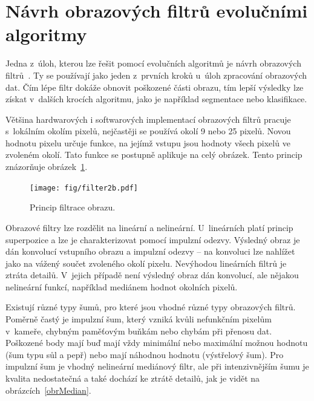 \section{Návrh obrazových filtrů evolučními algoritmy}
\label{secIF}

Jedna z~úloh, kterou lze řešit pomocí evolučních algoritmů je návrh obrazových filtrů~\cite{ZelenaIF}. Ty se používají jako jeden z~prvních kroků u~úloh zpracování obrazových dat. Čím lépe filtr dokáže obnovit poškozené části obrazu, tím lepší výsledky lze získat v~dalších krocích algoritmu, jako je například segmentace nebo klasifikace.

Většina hardwarových i softwarových implementací obrazových filtrů pracuje s~lokálním okolím pixelů, nejčastěji se používá okolí 9 nebo 25 pixelů. Novou hodnotu pixelu určuje funkce, na jejímž vstupu jsou hodnoty všech pixelů ve zvoleném okolí. Tato funkce se postupně aplikuje na celý obrázek. Tento princip znázorňuje obrázek~\ref{obrIFokoli}.

\begin{figure}[htb]
    \centering\texttt{[image: fig/filter2b.pdf]}
    \caption{Princip filtrace obrazu.}
    \label{obrIFokoli}
\end{figure}

Obrazové filtry lze rozdělit na lineární a nelineární. U~lineárních platí princip superpozice a lze je charakterizovat pomocí impulzní odezvy. Výsledný obraz je dán konvolucí vstupního obrazu a impulzní odezvy -- na konvoluci lze nahlížet jako na vážený součet zvoleného okolí pixelu. Nevýhodou lineárních filtrů je ztráta detailů. V~jejich případě není výsledný obraz dán konvolucí, ale nějakou nelineární funkcí, například mediánem hodnot okolních pixelů.

Existují různé typy šumů, pro které jsou vhodné různé typy obrazových filtrů. Poměrně častý je impulzní šum, který vzniká kvůli nefunkčním pixelům v~kameře, chybným paměťovým buňkám nebo chybám při přenosu dat. Poškozené body mají buď mají vždy minimální nebo maximální možnou hodnotu (šum typu sůl a pepř) nebo mají náhodnou hodnotu (výstřelový šum). Pro impulzní šum je vhodný nelineární mediánový filtr, ale při intenzivnějším šumu je kvalita nedostatečná a také dochází ke ztrátě detailů, jak je vidět na obrázcích~\ref{obrMedian}.

